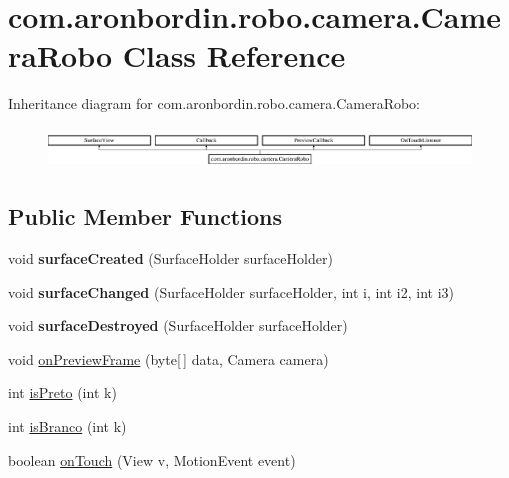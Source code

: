 \hypertarget{classcom_1_1aronbordin_1_1robo_1_1camera_1_1CameraRobo}{\section{com.\+aronbordin.\+robo.\+camera.\+Camera\+Robo Class Reference}
\label{classcom_1_1aronbordin_1_1robo_1_1camera_1_1CameraRobo}
}
Inheritance diagram for com.\+aronbordin.\+robo.\+camera.\+Camera\+Robo\+:\begin{figure}[H]
\begin{center}
\leavevmode
\includegraphics[height=1.068702cm]{d6/dc1/classcom_1_1aronbordin_1_1robo_1_1camera_1_1CameraRobo}
\end{center}
\end{figure}
\subsection*{Public Member Functions}
\begin{DoxyCompactItemize}
\item 
\hypertarget{classcom_1_1aronbordin_1_1robo_1_1camera_1_1CameraRobo_a2dcd4415d9acc0de33e6bed7cc843c6e}{void {\bfseries surface\+Created} (Surface\+Holder surface\+Holder)}\label{classcom_1_1aronbordin_1_1robo_1_1camera_1_1CameraRobo_a2dcd4415d9acc0de33e6bed7cc843c6e}

\item 
\hypertarget{classcom_1_1aronbordin_1_1robo_1_1camera_1_1CameraRobo_a88bfbd15922bb82b51cc33f0d401c602}{void {\bfseries surface\+Changed} (Surface\+Holder surface\+Holder, int i, int i2, int i3)}\label{classcom_1_1aronbordin_1_1robo_1_1camera_1_1CameraRobo_a88bfbd15922bb82b51cc33f0d401c602}

\item 
\hypertarget{classcom_1_1aronbordin_1_1robo_1_1camera_1_1CameraRobo_afd381329a45a7ee2ad06e47d0b917e3c}{void {\bfseries surface\+Destroyed} (Surface\+Holder surface\+Holder)}\label{classcom_1_1aronbordin_1_1robo_1_1camera_1_1CameraRobo_afd381329a45a7ee2ad06e47d0b917e3c}

\item 
void \hyperlink{classcom_1_1aronbordin_1_1robo_1_1camera_1_1CameraRobo_a0ccae659a8cdca149c700c82480a69dd}{on\+Preview\+Frame} (byte\mbox{[}$\,$\mbox{]} data, Camera camera)
\item 
int \hyperlink{classcom_1_1aronbordin_1_1robo_1_1camera_1_1CameraRobo_aa4a9a1f4266f8706f7ce0f7db77fa1ad}{is\+Preto} (int k)
\item 
int \hyperlink{classcom_1_1aronbordin_1_1robo_1_1camera_1_1CameraRobo_ac34a9602b2ee4d84d1b3deb016b932ef}{is\+Branco} (int k)
\item 
boolean \hyperlink{classcom_1_1aronbordin_1_1robo_1_1camera_1_1CameraRobo_a290f5d43c351368627e558213a873fb3}{on\+Touch} (View v, Motion\+Event event)
\end{DoxyCompactItemize}
